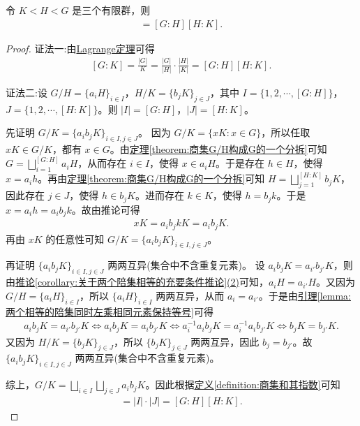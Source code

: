 \documentclass[../../main.tex]{subfiles}
\begin{document}
\begin{proposition}
令 \(K < H < G\) 是三个有限群，则
\begin{align*}
[G : K] = [G : H][H : K] .
\end{align*}
\end{proposition}
\begin{proof}
{\color{blue}证法一:}由\hyperref[theorem:Lagrange定理]{Lagrange定理}可得
\begin{align*}
\left[ G:K \right] =\frac{\left| G \right|}{K}=\frac{\left| G \right|}{\left| H \right|}\cdot \frac{\left| H \right|}{\left| K \right|}=\left[ G:H \right] \left[ H:K \right] .
\end{align*}

{\color{blue}证法二:}设 \(G/H = \{a_iH\}_{i \in I}\)，\(H/K = \{b_jK\}_{j \in J}\)，其中 \(I = \{1, 2, \cdots, [G : H]\}\)，\(J = \{1, 2, \cdots, [H : K]\}\)。则 \(|I| = [G : H]\)，\(|J| = [H : K]\)。

先证明 \(G/K = \{a_ib_jK\}_{i \in I, j \in J}\)。
因为 \(G/K = \{xK : x \in G\}\)，所以任取 \(xK \in G/K\)，都有 \(x \in G\)。由\hyperref[theorem:商集G/H构成G的一个分拆]{定理\ref{theorem:商集G/H构成G的一个分拆}}可知 \(G = \bigsqcup_{i = 1}^{[G : H]} a_iH\)，从而存在 \(i \in I\)，使得 \(x \in a_iH\)。于是存在 \(h \in H\)，使得 \(x = a_ih\)。再由\hyperref[theorem:商集G/H构成G的一个分拆]{定理\ref{theorem:商集G/H构成G的一个分拆}}可知 \(H = \bigsqcup_{j = 1}^{[H : K]} b_jK\)，因此存在 \(j \in J\)，使得 \(h \in b_jK\)。进而存在 \(k \in K\)，使得 \(h = b_jk\)。于是 \(x = a_ih = a_ib_jk\)。故由推论可得
\begin{align*}
xK = a_ib_jkK = a_ib_jK.
\end{align*}
再由 \(xK\) 的任意性可知 \(G/K = \{a_ib_jK\}_{i \in I, j \in J}\)。

再证明 \(\{a_ib_jK\}_{i \in I, j \in J}\) 两两互异(集合中不含重复元素)。
设 \(a_ib_jK = a_{i'}b_{j'}K\)，则由\hyperref[corollary:关于两个陪集相等的充要条件推论]{推论\ref{corollary:关于两个陪集相等的充要条件推论}(2)}可知，\(a_iH = a_{i'}H\)。又因为 \(G/H = \{a_iH\}_{i \in I}\)，所以 \(\{a_iH\}_{i \in I}\) 两两互异，从而 \(a_i = a_{i'}\)。于是由\hyperref[lemma:两个相等的陪集同时左乘相同元素保持等号]{引理\ref{lemma:两个相等的陪集同时左乘相同元素保持等号}}可得
\begin{align*}
a_ib_jK=a_{i\prime}b_{j\prime}K\Leftrightarrow a_ib_jK=a_ib_{j\prime}K\Leftrightarrow a_{i}^{-1}a_ib_jK=a_{i}^{-1}a_ib_{j\prime}K\Leftrightarrow b_jK=b_{j\prime}K.
\end{align*}
又因为 \(H/K = \{b_jK\}_{j \in J}\)，所以 \(\{b_jK\}_{j \in J}\) 两两互异，因此 \(b_j = b_{j'}\)。故 \(\{a_ib_jK\}_{i \in I, j \in J}\) 两两互异(集合中不含重复元素)。

综上，\(G/K = \bigsqcup_{i \in I} \bigsqcup_{j \in J} a_ib_jK\)。因此根据\hyperref[definition:商集和其指数]{定义\ref{definition:商集和其指数}}可知
\begin{align*}
[G : K] = |I| \cdot |J| = [G : H][H : K].
\end{align*} 
\end{proof}
\end{document}
